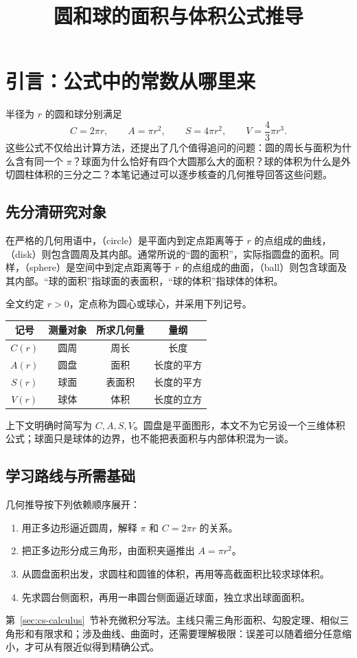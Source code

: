\documentclass[UTF8]{ctexart}
\title{圆和球的面积与体积公式推导}
\author{}
\date{}
\begin{document}
\maketitle
\tableofcontents

\section{引言：公式中的常数从哪里来}
\label{sec:cs-introduction}

半径为 $r$ 的圆和球分别满足
\[
  C=2\pi r,\qquad A=\pi r^2,\qquad
  S=4\pi r^2,\qquad V=\frac43\pi r^3.
\]
这些公式不仅给出计算方法，还提出了几个值得追问的问题：圆的周长与面积为什么含有同一个 $\pi$？球面为什么恰好有四个大圆那么大的面积？球的体积为什么是外切圆柱体积的三分之二？本笔记通过可以逐步核查的几何推导回答这些问题。

\subsection{先分清研究对象}

在严格的几何用语中，（circle）是平面内到定点距离等于 $r$ 的点组成的曲线，（disk）则包含圆周及其内部。通常所说的“圆的面积”，实际指圆盘的面积。同样，（sphere）是空间中到定点距离等于 $r$ 的点组成的曲面，（ball）则包含球面及其内部。“球的面积”指球面的表面积，“球的体积”指球体的体积。

全文约定 $r>0$，定点称为圆心或球心，并采用下列记号。
\begin{center}
\begin{tabular}{c c c c}
\toprule
记号 & 测量对象 & 所求几何量 & 量纲 \\
\midrule
$C(r)$ & 圆周 & 周长 & 长度 \\
$A(r)$ & 圆盘 & 面积 & 长度的平方 \\
$S(r)$ & 球面 & 表面积 & 长度的平方 \\
$V(r)$ & 球体 & 体积 & 长度的立方 \\
\bottomrule
\end{tabular}
\end{center}
上下文明确时简写为 $C,A,S,V$。圆盘是平面图形，本文不为它另设一个三维体积公式；球面只是球体的边界，也不能把表面积与内部体积混为一谈。

\subsection{学习路线与所需基础}

几何推导按下列依赖顺序展开：
\begin{enumerate}
  \item 用正多边形逼近圆周，解释 $\pi$ 和 $C=2\pi r$ 的关系。
  \item 把正多边形分成三角形，由面积夹逼推出 $A=\pi r^2$。
  \item 从圆盘面积出发，求圆柱和圆锥的体积，再用等高截面积比较求球体积。
  \item 先求圆台侧面积，再用一串圆台侧面逼近球面，独立求出球面面积。
\end{enumerate}
第~\ref{sec:cs-calculus}~节补充微积分写法。主线只需三角形面积、勾股定理、相似三角形和有限求和；涉及曲线、曲面时，还需要理解极限：误差可以随着细分任意缩小，才可从有限近似得到精确公式。
\end{document}
